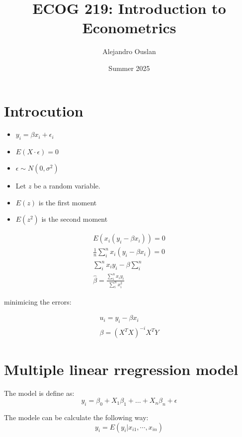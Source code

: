 \documentclass[10pt, oneside]{article}
\title{ECOG 219: Introduction to Econometrics}
\author{Alejandro Ouslan}
\date{Summer 2025}
\begin{document}
\maketitle
\tableofcontents

\vspace{.25in}

\section{Introcution}
\begin{itemize}
  \item $y_i = \beta x_i + \epsilon_i$
  \item $E(X \cdot \epsilon) = 0$ 
  \item $\epsilon \sim N(0,\sigma^2)$
\end{itemize}


\begin{itemize}
  \item Let $z$ be a random variable. 
  \item $E(z)$ is the first moment 
  \item $E(z^2)$ is the second moment
\end{itemize}

\[
  \begin{split}
    E(x_i(y_i - \beta x_i)) = 0 \\
    \frac{1}{n}\sum_{i}^{n}x_i(y_i -\beta x_i) = 0 \\
    \sum_{i}^{n} x_i y_i - \beta \sum_{i}^{n} \\ 
    \hat{\beta} = \frac{\sum_{i}^{n}x_i y_i}{\sum_{i}^{n}x_i^2}
  \end{split}
\]


minimicing the errors:

\[
\begin{split}
  u_i = y_i - \beta x_i \\
  \beta = (X^TX)^{-i} X^{T}Y
\end{split}
\]

\section{Multiple linear rregression model}

The model is define as:
\begin{equation}
  y_i = \beta_0 + X_1 \beta_1 + \ldots + X_n \beta_n + \epsilon
\end{equation}


The modele can be calculate the following way:
\begin{equation}
y_i = E(y_i| x_{i1},\cdots,x_{in})
\end{equation}
\end{document}

